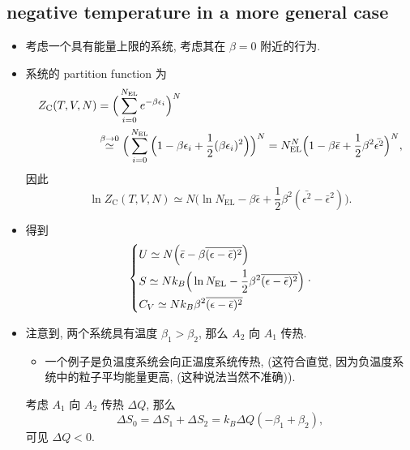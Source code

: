 \subsection{negative temperature in a more general case}
\begin{itemize}
	\item 考虑一个具有能量上限的系统, 考虑其在 $\beta = 0$ 附近的行为.
	
	\item 系统的 partition function 为
	\begin{align}
		Z_\text{C}(T, V, N) &= \Big( \sum_{i = 0}^{N_\text{EL}} e^{- \beta \epsilon_i} \Big)^N \notag \\
		&\overset{\beta \rightarrow 0}{\simeq} \Big( \sum_{i = 0}^{N_\text{EL}} \Big( 1 - \beta \epsilon_i + \frac{1}{2} (\beta \epsilon_i)^2 \Big) \Big)^N = N_\text{EL}^N \Big( 1 - \beta \bar{\epsilon} + \frac{1}{2} \beta^2 \bar{\epsilon^2} \Big)^N,
	\end{align}
	因此
	\begin{equation}
		\ln Z_\text{C}(T, V, N) \simeq N \Big( \ln N_\text{EL} - \beta \bar{\epsilon} + \frac{1}{2} \beta^2 (\bar{\epsilon^2} - \bar{\epsilon}^2) \Big).
	\end{equation}
	
	\item 得到
	\begin{equation}
		\begin{dcases}
			U \simeq N \Big( \bar{\epsilon} - \beta \overline{(\epsilon - \bar{\epsilon})^2} \Big) \\
			S \simeq N k_B \Big( \ln N_\text{EL} - \frac{1}{2} \beta^2 \overline{(\epsilon - \bar{\epsilon})^2} \Big) \\
			C_V \simeq N k_B \beta^2 \overline{(\epsilon - \bar{\epsilon})^2}
		\end{dcases}.
	\end{equation}
	
	\item 注意到, 两个系统具有温度 $\beta_1 > \beta_2$, 那么 $A_2$ 向 $A_1$ 传热.
	\begin{itemize}
		\item 一个例子是负温度系统会向正温度系统传热, (这符合直觉, 因为负温度系统中的粒子平均能量更高, (这种说法当然不准确)).
	\end{itemize}
	
	\begin{tcolorbox}[title=proof:]
		考虑 $A_1$ 向 $A_2$ 传热 $\Delta Q$, 那么
		\begin{equation}
			\Delta S_0 = \Delta S_1 + \Delta S_2 = k_B \Delta Q (- \beta_1 + \beta_2),
		\end{equation}
		可见 $\Delta Q < 0$.
	\end{tcolorbox}
\end{itemize}
